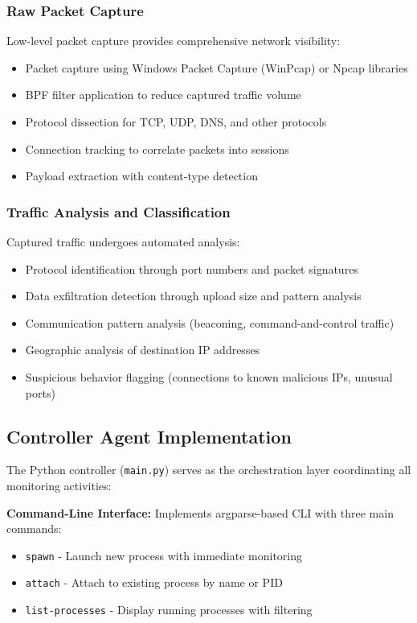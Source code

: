\subsubsection{Raw Packet Capture}

Low-level packet capture provides comprehensive network visibility:

\begin{itemize}
    \item Packet capture using Windows Packet Capture (WinPcap) or Npcap libraries
    \item BPF filter application to reduce captured traffic volume
    \item Protocol dissection for TCP, UDP, DNS, and other protocols
    \item Connection tracking to correlate packets into sessions
    \item Payload extraction with content-type detection
\end{itemize}

\subsubsection{Traffic Analysis and Classification}

Captured traffic undergoes automated analysis:

\begin{itemize}
    \item Protocol identification through port numbers and packet signatures
    \item Data exfiltration detection through upload size and pattern analysis
    \item Communication pattern analysis (beaconing, command-and-control traffic)
    \item Geographic analysis of destination IP addresses
    \item Suspicious behavior flagging (connections to known malicious IPs, unusual ports)
\end{itemize}

\subsection{Controller Agent Implementation}

The Python controller (\texttt{main.py}) serves as the orchestration layer coordinating all monitoring activities:

\textbf{Command-Line Interface:}
Implements argparse-based CLI with three main commands:
\begin{itemize}
    \item \texttt{spawn} - Launch new process with immediate monitoring
    \item \texttt{attach} - Attach to existing process by name or PID  
    \item \texttt{list-processes} - Display running processes with filtering
\end{itemize}


